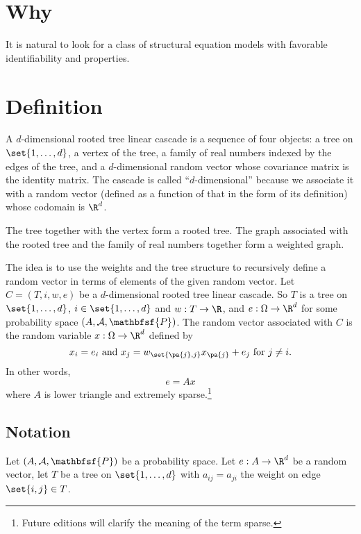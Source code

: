 
\section*{Why}

It is natural to look for a class of structural equation models with favorable identifiability and properties.

\section*{Definition}

A \t{$d$-dimensional rooted tree linear cascade} is a sequence of four objects: a tree on $\set{1, \dots , d}$, a vertex of the tree, a family of real numbers indexed by the edges of the tree, and a $d$-dimensional random vector whose covariance matrix is the identity matrix.
The cascade is called ``$d$-dimensional'' because we associate it with a random vector (defined as a function of that in the form of its definition) whose codomain is $\R ^d$.

The tree together with the vertex form a rooted tree.
The graph associated with the rooted tree and the family of real numbers together form a weighted graph.

The idea is to use the weights and the tree structure to recursively define a random vector in terms of elements of the given random vector.
Let $C = (T, i, w, e)$ be a $d$-dimensional rooted tree linear cascade.
So $T$ is a tree on $\set{1, \dots , d}$, $i \in \set{1, \dots , d}$ and $w: T \to \R $, and $e: \Omega  \to \R ^d$ for some probability space $(A, \mathcal{A} , \mathbfsf{P} )$.
The random vector associated with $C$ is the random variable $x: \Omega  \to \R ^d$ defined by
\[
x_i = e_i \text{ and } x_j = w_{\set{\pa{j}, j}}x_{\pa{j}} + e_{j} \text{ for } j \neq i.
\]
In other words,
\[
e = Ax
\]
where $A$ is lower triangle and extremely sparse.\footnote{Future editions will clarify the meaning of the term sparse.}

\subsection*{Notation}

Let $(A, \mathcal{A} , \mathbfsf{P} )$ be a probability space.
Let $e: A \to \R ^d$ be a random vector, let $T$ be a tree on $\set{1, \dots , d}$ with $a_{ij} = a_{ji}$ the weight on edge $\set{i, j} \in T$.
